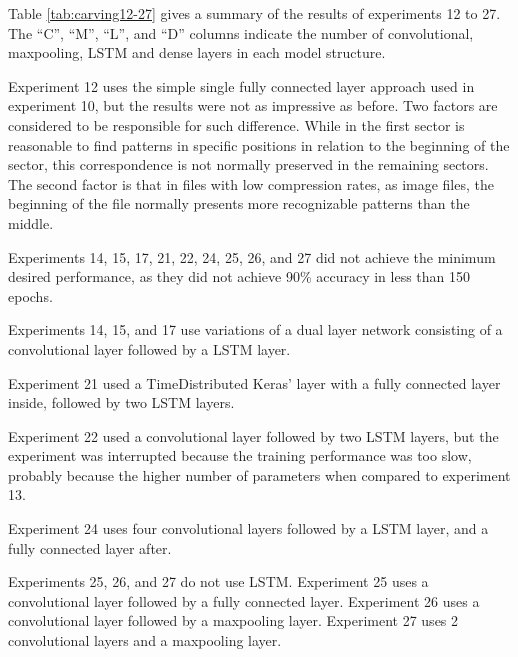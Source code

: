 Table \ref{tab:carving12-27} gives a summary of the results of experiments 12 to 27. The ``C'', ``M'', ``L'', and ``D'' columns indicate the number of convolutional, maxpooling, LSTM and dense layers in each model structure.


Experiment 12 uses the simple single fully connected layer approach used in experiment 10, but the results were not as impressive as before. Two factors are considered to be responsible for such difference. While in the first sector is reasonable to find patterns in specific positions in relation to the beginning of the sector, this correspondence is not normally preserved in the remaining sectors. The second factor is that in files with low compression rates, as image files, the beginning of the file normally presents more recognizable patterns than the middle.

Experiments 14, 15, 17, 21, 22, 24, 25, 26, and 27 did not achieve the minimum desired performance, as they did not achieve 90\% accuracy in less than 150 epochs.

Experiments 14, 15, and 17 use variations of a dual layer network consisting of a convolutional layer followed by a LSTM layer.

Experiment 21 used a TimeDistributed Keras' layer with a fully connected layer inside, followed by two LSTM layers.

Experiment 22 used a convolutional layer followed by two LSTM layers, but the experiment was interrupted because the training performance was too slow, probably because the higher number of parameters when compared to experiment 13.

Experiment 24 uses four convolutional layers followed by a LSTM layer, and a fully connected layer after.

Experiments 25, 26, and 27 do not use LSTM. Experiment 25 uses a convolutional layer followed by a fully connected layer. Experiment 26 uses a convolutional layer followed by a maxpooling layer. Experiment 27 uses 2 convolutional layers and a maxpooling layer.




